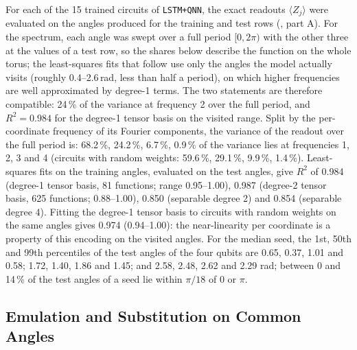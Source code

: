 \documentclass[11pt,a4paper]{article}
\begin{document}
For each of the 15 trained circuits of \texttt{LSTM+QNN}, the exact readouts $\langle Z_j\rangle$ were evaluated on the angles produced for the training and test rows (, part A). For the spectrum, each angle was swept over a full period $[0,2\pi)$ with the other three at the values of a test row, so the shares below describe the function on the whole torus; the least-squares fits that follow use only the angles the model actually visits (roughly 0.4--2.6\,rad, less than half a period), on which higher frequencies are well approximated by degree-1 terms. The two statements are therefore compatible: 24\,\% of the variance at frequency 2 over the full period, and $R^2=0.984$ for the degree-1 tensor basis on the visited range. Split by the per-coordinate frequency of its Fourier components, the variance of the readout over the full period is: 68.2\,\%, 24.2\,\%, 6.7\,\%, 0.9\,\% of the variance lies at frequencies 1, 2, 3 and 4 (circuits with random weights: 59.6\,\%, 29.1\,\%, 9.9\,\%, 1.4\,\%). Least-squares fits on the training angles, evaluated on the test angles, give $R^2$ of 0.984 (degree-1 tensor basis, 81 functions; range 0.95--1.00), 0.987 (degree-2 tensor basis, 625 functions; 0.88--1.00), 0.850 (separable degree 2) and 0.854 (separable degree 4). Fitting the degree-1 tensor basis to circuits with random weights on the same angles gives 0.974 (0.94--1.00): the near-linearity per coordinate is a property of this encoding on the visited angles. For the median seed, the 1st, 50th and 99th percentiles of the test angles of the four qubits are 0.65, 0.37, 1.01 and 0.58; 1.72, 1.40, 1.86 and 1.45; and 2.58, 2.48, 2.62 and 2.29 rad; between 0 and 14\,\% of the test angles of a seed lie within $\pi/18$ of 0 or $\pi$.

\subsection{Emulation and Substitution on Common Angles}
\label{app:emulation}
\end{document}
